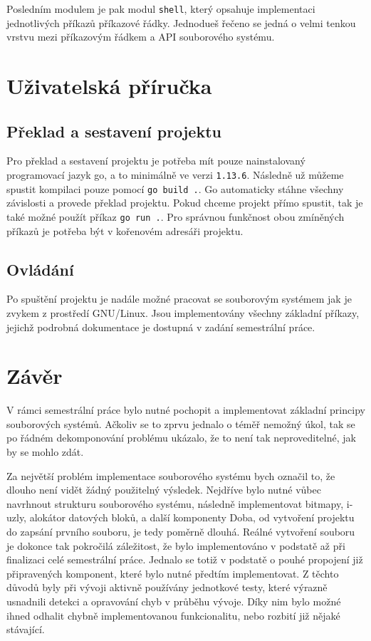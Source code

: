 \documentclass[12pt, a4paper]{article}
\begin{document}
    Posledním modulem je pak modul \texttt{shell}, který opsahuje implementaci jednotlivých příkazů příkazové řádky.
    Jednodueš řečeno se jedná o velmi tenkou vrstvu mezi příkazovým řádkem a API souborového systému.

    \section{Uživatelská příručka}
    \subsection{Překlad a sestavení projektu}
    Pro překlad a sestavení projektu je potřeba mít pouze nainstalovaný programovací jazyk go, a to minimálně ve verzi \texttt{1.13.6}.
    Následně už můžeme spustit kompilaci pouze pomocí \texttt{go build .}.
    Go automaticky stáhne všechny závislosti a provede překlad projektu.
    Pokud chceme projekt přímo spustit, tak je také možné použít příkaz \texttt{go run .}.
    Pro správnou funkčnost obou zmíněných příkazů je potřeba být v kořenovém adresáři projektu.

    \subsection{Ovládání}
    Po spuštění projektu je nadále možné pracovat se souborovým systémem jak je zvykem z prostředí GNU/Linux.
    Jsou implementovány všechny základní příkazy, jejichž podrobná dokumentace je dostupná v zadání semestrální práce.

    \section{Závěr}
    V rámci semestrální práce bylo nutné pochopit a implementovat základní principy souborových systémů.
    Ačkoliv se to zprvu jednalo o téměř nemožný úkol, tak se po řádném dekomponování problému ukázalo, že to není tak neproveditelné, jak by se mohlo zdát.

    Za největší problém implementace souborového systému bych označil to, že dlouho není vidět žádný použitelný výsledek.
    Nejdříve bylo nutné vůbec navrhnout strukturu souborového systému, následně implementovat bitmapy, i-uzly, alokátor datových bloků, a další komponenty
    Doba, od vytvoření projektu do zapsání prvního souboru, je tedy poměrně dlouhá.
    Reálné vytvoření souboru je dokonce tak pokročilá záležitost, že bylo implementováno v podstatě až při finalizaci celé semestrální práce.
    Jednalo se totiž v podstatě o pouhé propojení již připravených komponent, které bylo nutné předtím implementovat.
    Z těchto důvodů byly při vývoji aktivně používány jednotkové testy, které výrazně usnadnili detekci a opravování chyb v průběhu vývoje.
    Díky nim bylo možné ihned odhalit chybně implementovanou funkcionalitu, nebo rozbití již nějaké stávající.
\end{document}
